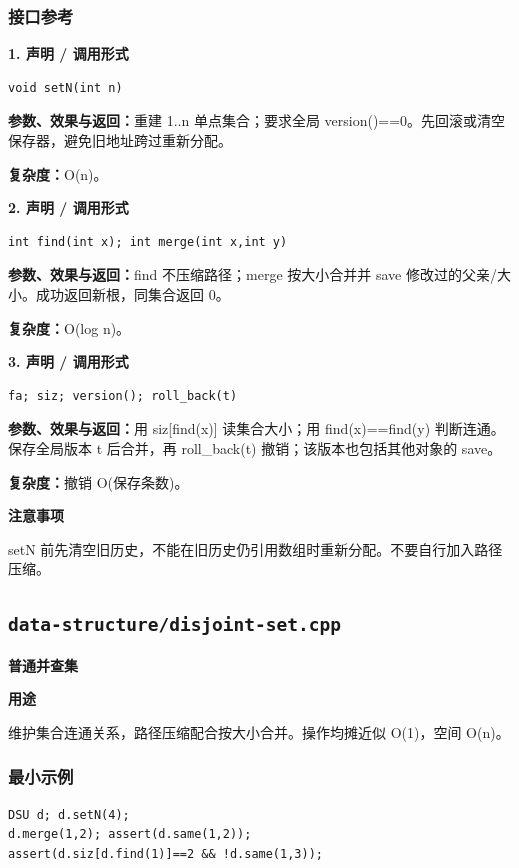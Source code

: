 \documentclass[UTF8,a4paper,10pt]{ctexart}
\newcommand{\TemplUsage}[1]{\textbf{用途}\par #1\par}
\newcommand{\TemplNote}[1]{\textbf{注意事项}\par #1\par}
\begin{document}
\subsubsection*{接口参考}
\noindent\begin{minipage}{\textwidth}
\textbf{1. 声明 / 调用形式}
\begin{lstlisting}
void setN(int n)
\end{lstlisting}
\textbf{参数、效果与返回：}重建 1..n 单点集合；要求全局 version()==0。先回滚或清空保存器，避免旧地址跨过重新分配。

\textbf{复杂度：}O(n)。

\end{minipage}\par\vspace{0.4em}
\noindent\begin{minipage}{\textwidth}
\textbf{2. 声明 / 调用形式}
\begin{lstlisting}
int find(int x); int merge(int x,int y)
\end{lstlisting}
\textbf{参数、效果与返回：}find 不压缩路径；merge 按大小合并并 save 修改过的父亲/大小。成功返回新根，同集合返回 0。

\textbf{复杂度：}O(log n)。

\end{minipage}\par\vspace{0.4em}
\noindent\begin{minipage}{\textwidth}
\textbf{3. 声明 / 调用形式}
\begin{lstlisting}
fa; siz; version(); roll_back(t)
\end{lstlisting}
\textbf{参数、效果与返回：}用 siz[find(x)] 读集合大小；用 find(x)==find(y) 判断连通。保存全局版本 t 后合并，再 roll\_back(t) 撤销；该版本也包括其他对象的 save。

\textbf{复杂度：}撤销 O(保存条数)。

\TemplNote{setN 前先清空旧历史，不能在旧历史仍引用数组时重新分配。不要自行加入路径压缩。}
\end{minipage}\par\vspace{0.4em}
\clearpage
\subsection{\texttt{data-structure/disjoint-set.cpp}}
\textbf{普通并查集}\par
\TemplUsage{维护集合连通关系，路径压缩配合按大小合并。操作均摊近似 O(1)，空间 O(n)。}
\subsubsection*{最小示例}
\begin{lstlisting}
DSU d; d.setN(4);
d.merge(1,2); assert(d.same(1,2));
assert(d.siz[d.find(1)]==2 && !d.same(1,3));
\end{lstlisting}
\end{document}
